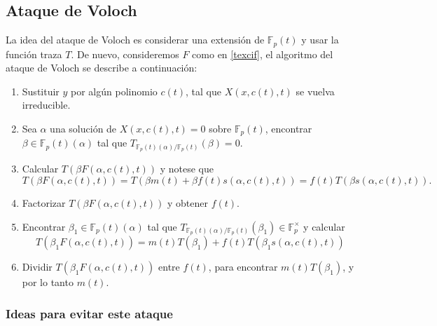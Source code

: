 \documentclass[11pt]{article}
\newcommand{\Fp}{\mathbb{F}_p}
\numberwithin{equation}{section} %
\numberwithin{figure}{section} %
\numberwithin{table}{section} %
\begin{document}
		\subsection{Ataque de Voloch}
		\label{32VOLOCH}

			La idea del ataque de Voloch \cite{Vol07} es considerar una extensi\'on de $\Fp(t)$ y usar la funci\'on traza $T$. De nuevo, consideremos $F$ como en \ref{texcif}, el algoritmo del ataque de Voloch se describe a continuaci\'on:

			\begin{enumerate}
				\item Sustituir $y$ por alg\'un polinomio $c(t)$, tal que $X(x,c(t),t)$ se vuelva irreducible.
				\item Sea $\alpha$ una soluci\'on de $X(x,c(t),t)=0$ sobre $\Fp(t)$, encontrar $\beta\in\Fp(t)(\alpha)$ tal que $T_{\Fp(t)(\alpha)/\Fp(t)}(\beta)=0$.
				\item Calcular $T(\beta F(\alpha,c(t),t))$ y notese que
					$$
						T(\beta F(\alpha,c(t),t))=T(\beta m(t)+\beta f(t)s(\alpha,c(t),t))=f(t)T(\beta s(\alpha,c(t),t)).
					$$
				\item Factorizar $T(\beta F(\alpha,c(t),t))$ y obtener $f(t)$.
				\item Encontrar $\beta_1\in\Fp(t)(\alpha)$ tal que $T_{\Fp(t)(\alpha)/\Fp(t)}(\beta_1)\in\Fp^ \times$ y calcular
					$$
						T(\beta_1 F(\alpha,c(t),t))=m(t)T(\beta_1)+f(t)T(\beta_1 s(\alpha,c(t),t))
					$$
				\item Dividir $T(\beta_1 F(\alpha,c(t),t))$ entre $f(t)$, para encontrar $m(t)T(\beta_1)$, y por lo tanto $m(t)$.
			\end{enumerate}



			\subsubsection{Ideas para evitar este ataque}
			\label{321ANTVOL}
\end{document}
